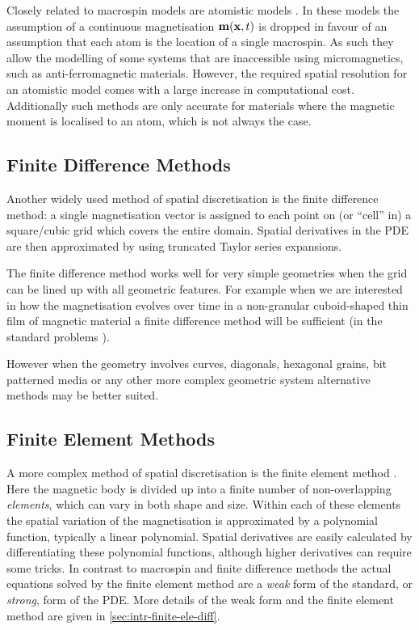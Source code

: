Closely related to macrospin models are atomistic models \cite{Evans2014}.
In these models the assumption of a continuous magnetisation $\boldsymbol{\mathrm{m}}(\boldsymbol{\mathrm{x}}, t)$ is dropped in favour of an assumption that each atom is the location of a single macrospin.
As such they allow the modelling of some systems that are inaccessible using micromagnetics, such as anti-ferromagnetic materials.
However, the required spatial resolution for an atomistic model comes with a large increase in computational cost.
Additionally  such methods are only accurate for materials where the magnetic moment is localised to an atom, which is not always the case.


\subsection{Finite Difference Methods}
\label{sec:sd-finite-diff-meth}

Another widely used method of spatial discretisation is the finite difference method: a single magnetisation vector is assigned to each point on (or ``cell'' in) a square/cubic grid which covers the entire domain.
Spatial derivatives in the PDE are then approximated by using truncated Taylor series expansions.

The finite difference method works well for very simple geometries when the grid can be lined up with all geometric features.
For example when we are interested in how the magnetisation evolves over time in a non-granular cuboid-shaped thin film of magnetic material a finite difference method will be sufficient (\eg in the \mumag standard problems \cite{mumag-website}).

However when the geometry involves curves, diagonals, hexagonal grains, bit patterned media or any other more complex geometric system alternative methods may be better suited.


\subsection{Finite Element Methods}
\label{sec:sd-finite-elem-meth}

A more complex method of spatial discretisation is the finite element method \cite{HowardElmanDavidSilvester2006}.
Here the magnetic body is divided up into a finite number of non-overlapping \emph{elements}, which can vary in both shape and size.
Within each of these elements the spatial variation of the magnetisation is approximated by a polynomial function, typically a linear polynomial.
Spatial derivatives are easily calculated by differentiating these polynomial functions, although higher derivatives can require some tricks.
In contrast to macrospin and finite difference methods the actual equations solved by the finite element method are a \emph{weak} form of the standard, or \emph{strong}, form of the PDE.
More details of the weak form and the finite element method are given in \cref{sec:intr-finite-ele-diff}.

